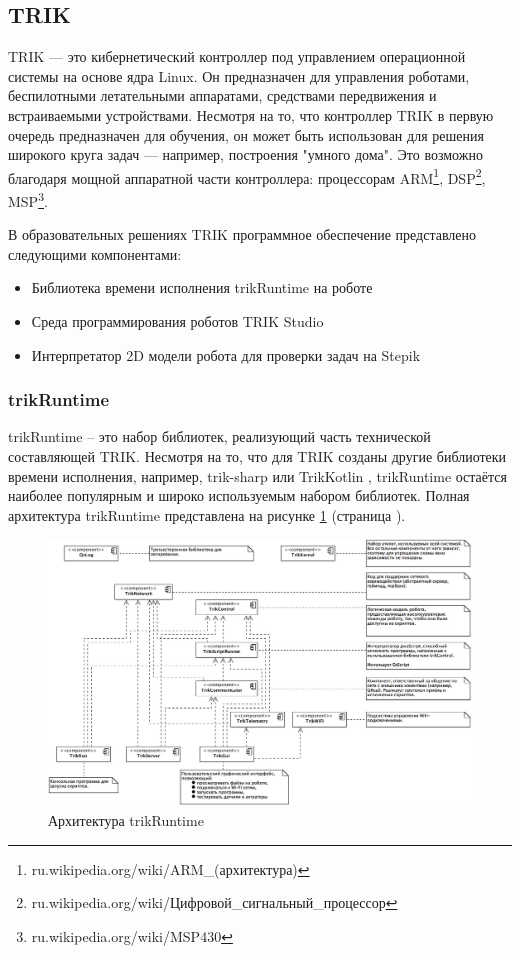 \documentclass[14pt]{matmex-diploma-custom}
\begin{document}
\subsection{TRIK}
TRIK — это кибернетический контроллер под управлением операционной системы на основе ядра Linux. Он предназначен для управления роботами, беспилотными летательными аппаратами, средствами передвижения и встраиваемыми устройствами. Несмотря на то, что контроллер TRIK в первую очередь предназначен для обучения, он может быть использован для решения широкого круга задач — например, построения "умного дома". Это возможно благодаря мощной аппаратной части контроллера: процессорам ARM\footnote{ru.wikipedia.org/wiki/ARM\_(архитектура)}, DSP\footnote{ru.wikipedia.org/wiki/Цифровой\_сигнальный\_процессор}, MSP\footnote{ru.wikipedia.org/wiki/MSP430}.

В образовательных решениях TRIK программное обеспечение представлено следующими компонентами:
\begin{itemize}
    \item Библиотека времени исполнения trikRuntime на роботе
    \item Среда программирования роботов TRIK Studio
    \item Интерпретатор 2D модели робота для проверки задач на Stepik
\end{itemize}

\subsubsection{trikRuntime}
trikRuntime -- это набор библиотек, реализующий часть технической составляющей TRIK. Несмотря на то, что для TRIK созданы другие библиотеки времени исполнения, например, trik-sharp \cite{KirsanovSECR, KirsanovDiploma} или TrikKotlin \cite{BelkovYearlyProject}, trikRuntime остаётся наиболее популярным и широко используемым набором библиотек. Полная архитектура trikRuntime представлена на рисунке \ref{trikRuntime} (страница \pageref{trikRuntime}).

\begin{figure}[h]
	\includegraphics[width=\textwidth]{images/trikRuntime.jpg}
	\caption{Архитектура trikRuntime}
	\label{trikRuntime}
\end{figure}
\end{document}
